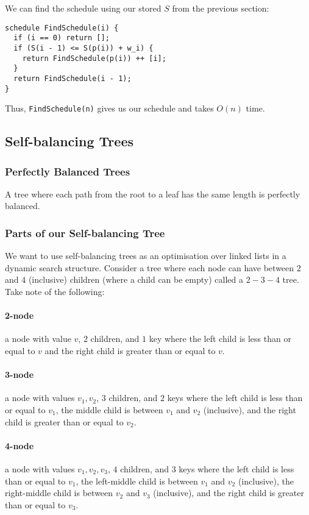We can find the schedule using our
stored $S$ from the previous section: \begin{lstlisting}
schedule FindSchedule(i) {
  if (i == 0) return [];
  if (S(i - 1) <= S(p(i)) + w_i) {
    return FindSchedule(p(i)) ++ [i]; 
  }
  return FindSchedule(i - 1);
}
\end{lstlisting} Thus, \texttt{FindSchedule(n)} gives us our schedule and 
takes $O(n)$ time.

\subsection{Self-balancing Trees}

\subsubsection{Perfectly Balanced Trees}
A tree where each path from the root to a leaf has the
same length is perfectly balanced.

\subsubsection{Parts of our Self-balancing Tree}
We want to use self-balancing trees as an optimisation over linked lists in a
dynamic search structure.
Consider a tree where each node can have between $2$ and $4$ (inclusive) children 
(where a child can be empty) called a $2-3-4$ tree. Take note of the following: 

  \paragraph{2-node} a node with value $v$, $2$ children, and $1$ key
  where the left child is less than or equal to $v$ and 
  the right child is greater than or equal to $v$.
  \paragraph{3-node} a node with values $v_1, v_2$, $3$ children, and $2$ keys
  where the left child is less than or equal to $v_1$, 
  the middle child is between $v_1$ and $v_2$ (inclusive),
  and the right child is greater than or equal to $v_2$.
  \paragraph{4-node} a node with values $v_1, v_2, v_3$, $4$ children, and $3$ keys
  where the left child is less than or equal to $v_1$, 
  the left-middle child is between $v_1$ and $v_2$ (inclusive),
  the right-middle child is between $v_2$ and $v_3$ (inclusive),
  and the right child is greater than or equal to $v_3$.

